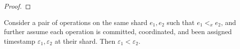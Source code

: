 \begin{proof}


\end{proof}

\begin{lem}
\label{lemma2}
Consider a pair of operations on the same shard $e_1, e_2$ such that $e_1 <_x e_2$, and further assume each operation is committed, coordinated, and been assigned timestamp $\varepsilon_1, \varepsilon_2$ at their shard. Then $\varepsilon_1 < \varepsilon_2$.
\end{lem}
